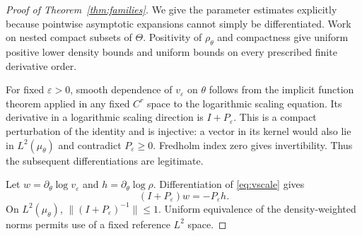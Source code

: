 \documentclass[11pt,a4paper]{article}
\theoremstyle{definition}\newtheorem{definition}[theorem]{Definition}
\theoremstyle{remark}\newtheorem{remark}[theorem]{Remark}
\newcommand{\eps}{\varepsilon}
\newcommand{\norm}[1]{\lVert #1\rVert}
\begin{document}
\begin{proof}[Proof of Theorem~\ref{thm:families}]
We give the parameter estimates explicitly because pointwise asymptotic expansions cannot simply be differentiated. Work on nested compact subsets of $\Theta$. Positivity of $\rho_\theta$ and compactness give uniform positive lower density bounds and uniform bounds on every prescribed finite derivative order.

For fixed $\eps>0$, smooth dependence of $v_\eps$ on $\theta$ follows from the implicit function theorem applied in any fixed $C^r$ space to the logarithmic scaling equation. Its derivative in a logarithmic scaling direction is $I+P_\eps$. This is a compact perturbation of the identity and is injective: a vector in its kernel would also lie in $L^2(\mu_\theta)$ and contradict $P_\eps\geq0$. Fredholm index zero gives invertibility. Thus the subsequent differentiations are legitimate.

Let $w=\partial_\theta\log v_\eps$ and $h=\partial_\theta\log\rho$. Differentiation of \eqref{eq:vscale} gives
\begin{equation}\label{eq:w}
(I+P_\eps)w=-P_\eps h.
\end{equation}
On $L^2(\mu_\theta)$, $\norm{(I+P_\eps)^{-1}}\leq1$. Uniform equivalence of the density-weighted norms permits use of a fixed reference $L^2$ space.


\end{proof}
\end{document}
